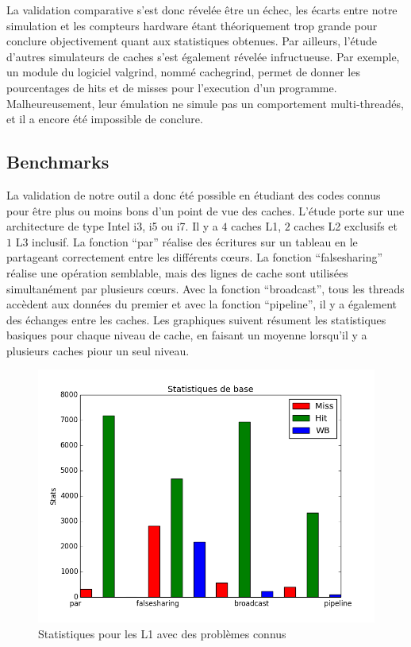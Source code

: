 La validation comparative s'est donc révelée être un échec, les écarts entre notre simulation et les compteurs hardware étant théoriquement trop grande pour conclure objectivement quant aux statistiques obtenues. Par ailleurs, l'étude d'autres simulateurs de caches s'est également révelée infructueuse. Par exemple, un module du logiciel valgrind, nommé cachegrind, permet de donner les pourcentages de hits et de misses pour l'execution d'un programme. Malheureusement, leur émulation ne simule pas un comportement multi-threadés, et il a encore été impossible de conclure.
 
\subsection{Benchmarks}
La validation de notre outil a donc été possible en étudiant des codes connus pour être plus ou moins bons d'un point de vue des caches. L'étude porte sur une architecture de type Intel i3, i5 ou i7. Il y a $4$ caches L1, $2$ caches L2 exclusifs et $1$ L3 inclusif. La fonction ``par'' réalise des écritures sur un tableau en le partageant correctement entre les différents c{\oe}urs. La fonction ``falsesharing'' réalise une opération semblable, mais des lignes de cache sont utilisées simultanément par plusieurs c{\oe}urs. Avec la fonction ``broadcast'', tous les threads accèdent aux données du premier et avec la fonction ``pipeline'', il y a également des échanges entre les caches. Les graphiques suivent résument les statistiques basiques pour chaque niveau de cache, en faisant un moyenne lorsqu'il y a plusieurs caches piour un seul niveau.

\begin{figure}[!h]
\begin{center}
   \includegraphics[scale=0.40]{images/stats_L1.png}
   \caption{\label{img:inclusifs} Statistiques pour les L1 avec des problèmes connus}
\end{center}
\end{figure}

